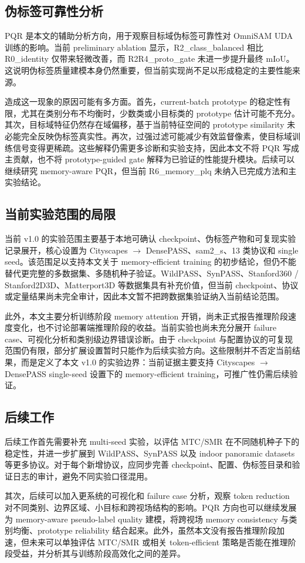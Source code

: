 \subsection{伪标签可靠性分析}
PQR 是本文的辅助分析方向，用于观察目标域伪标签可靠性对 OmniSAM UDA 训练的影响。当前 preliminary ablation 显示，R2\_class\_balanced 相比 R0\_identity 仅带来轻微改善，而 R2R4\_proto\_gate 未进一步提升最终 mIoU。这说明伪标签质量建模本身仍然重要，但当前实现尚不足以形成稳定的主要性能来源。

造成这一现象的原因可能有多方面。首先，current-batch prototype 的稳定性有限，尤其在类别分布不均衡时，少数类或小目标类的 prototype 估计可能不充分。其次，目标域特征仍然存在域偏移，基于当前特征空间的 prototype similarity 未必能完全反映伪标签真实性。再次，过强过滤可能减少有效监督像素，使目标域训练信号变得更稀疏。这些解释仍需更多诊断和实验支持，因此本文不将 PQR 写成主贡献，也不将 prototype-guided gate 解释为已验证的性能提升模块。后续可以继续研究 memory-aware PQR，但当前 R6\_memory\_plq 未纳入已完成方法和主实验结论。

\subsection{当前实验范围的局限}
当前 v1.0 的实验范围主要基于本地可确认 checkpoint、伪标签产物和可复现实验记录展开，核心设置为 Cityscapes $\rightarrow$ DensePASS、sam2\_s、13 类协议和 single seed。该范围足以支持本文关于 memory-efficient training 的初步结论，但仍不能替代更完整的多数据集、多随机种子验证。WildPASS、SynPASS、Stanford360 / Stanford2D3D、Matterport3D 等数据集具有补充价值，但当前 checkpoint、协议或定量结果尚未完全审计，因此本文暂不把跨数据集验证纳入当前结论范围。

此外，本文主要分析训练阶段 memory attention 开销，尚未正式报告推理阶段速度变化，也不讨论部署端推理阶段的收益。当前实验也尚未充分展开 failure case、可视化分析和类别级边界错误诊断。由于 checkpoint 与配置协议的可复现范围仍有限，部分扩展设置暂时只能作为后续实验方向。这些限制并不否定当前结果，而是定义了本文 v1.0 的实验边界：当前证据主要支持 Cityscapes $\rightarrow$ DensePASS single-seed 设置下的 memory-efficient training，可推广性仍需后续验证。

\subsection{后续工作}
后续工作首先需要补充 multi-seed 实验，以评估 MTC/SMR 在不同随机种子下的稳定性，并进一步扩展到 WildPASS、SynPASS 以及 indoor panoramic datasets 等更多协议。对于每个新增协议，应同步完善 checkpoint、配置、伪标签目录和验证日志的审计，避免不同实验口径混用。

其次，后续可以加入更系统的可视化和 failure case 分析，观察 token reduction 对不同类别、边界区域、小目标和跨视场结构的影响。PQR 方向也可以继续发展为 memory-aware pseudo-label quality 建模，将跨视场 memory consistency 与类别均衡、prototype reliability 结合起来。此外，虽然本文没有报告推理阶段加速，但未来可以单独评估 MTC/SMR 或相关 token-efficient 策略是否能在推理阶段受益，并分析其与训练阶段高效化之间的差异。
